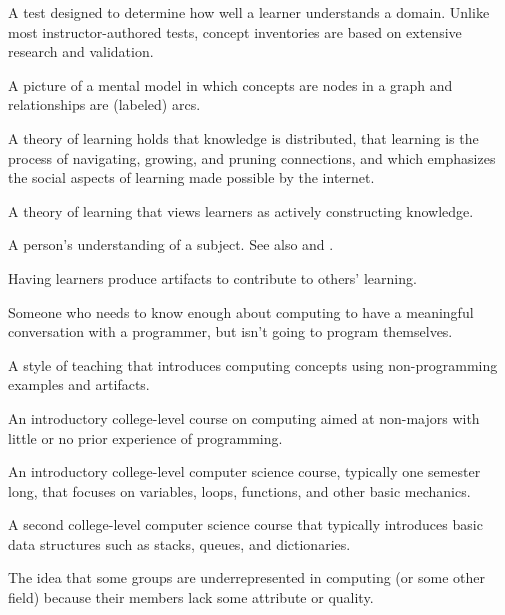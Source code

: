 \begin{description}
 A test designed to determine
how well a learner understands a domain.  Unlike most instructor-authored tests,
concept inventories are based on extensive research and validation.

 A picture of a mental model in which
concepts are nodes in a graph and relationships are (labeled) arcs.

 A theory of learning holds that knowledge
is distributed, that learning is the process of navigating, growing, and pruning
connections, and which emphasizes the social aspects of learning made possible
by the internet.

 A theory of learning that views
learners as actively constructing knowledge.

 A person's understanding of a
subject. See also
and .

 Having learners
produce artifacts to contribute to others' learning.

 Someone who
needs to know enough about computing to have a meaningful conversation with a
programmer, but isn't going to program themselves.

 A style of teaching that introduces
computing concepts using non-programming examples and artifacts.

 An introductory college-level course on computing aimed at
non-majors with little or no prior experience of programming.

 An introductory college-level computer science course,
typically one semester long, that focuses on variables, loops, functions, and
other basic mechanics.

 A second college-level computer science course that
typically introduces basic data structures such as stacks, queues, and
dictionaries.

 The idea that some groups are
underrepresented in computing (or some other field) because their members lack
some attribute or quality.


\end{description}
